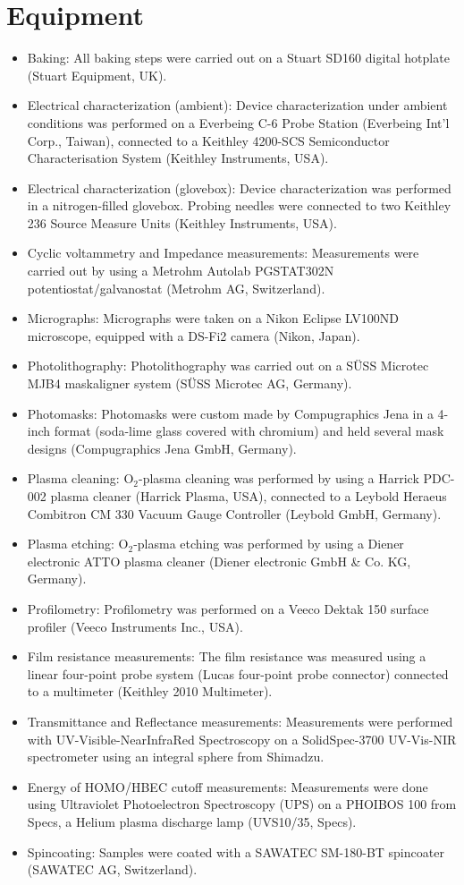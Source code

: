 \section{Equipment}
\begin{itemize}
\item Baking: All baking steps were carried out on a Stuart SD160 digital hotplate (Stuart Equipment, UK). 
\item Electrical characterization (ambient): Device characterization under ambient conditions was performed on a Everbeing C-6 Probe Station (Everbeing Int’l Corp., Taiwan), connected to a Keithley 4200-SCS Semiconductor Characterisation System (Keithley Instruments, USA). 
\item Electrical characterization (glovebox): Device characterization was performed in a nitrogen-filled glovebox. Probing needles were connected to two Keithley 236 Source Measure Units (Keithley Instruments, USA). 
\item Cyclic voltammetry and Impedance measurements: Measurements were carried out by using a Metrohm Autolab PGSTAT302N potentiostat/galvanostat (Metrohm AG, Switzerland).
\item Micrographs: Micrographs were taken on a Nikon Eclipse LV100ND microscope, equipped with a DS-Fi2 camera (Nikon, Japan). 
\item Photolithography: Photolithography was carried out on a SÜSS Microtec MJB4 maskaligner system (SÜSS Microtec AG, Germany). 
\item Photomasks: Photomasks were custom made by Compugraphics Jena in a 4-inch format (soda-lime glass covered with chromium) and held several mask designs (Compugraphics Jena GmbH, Germany). 
\item Plasma cleaning: O$_{2}$-plasma cleaning was performed by using a Harrick PDC-002 plasma cleaner (Harrick Plasma, USA), connected to a Leybold Heraeus Combitron CM 330 Vacuum Gauge Controller (Leybold GmbH, Germany). 
\item Plasma etching: O$_{2}$-plasma etching was performed by using a Diener electronic ATTO plasma cleaner (Diener electronic GmbH \& Co. KG, Germany). 
\item Profilometry: Profilometry was performed on a Veeco Dektak 150 surface profiler (Veeco Instruments Inc., USA).
\item Film resistance measurements: The film resistance was measured using a linear four-point probe system (Lucas four-point probe connector) connected to a multimeter (Keithley 2010 Multimeter).
\item Transmittance and Reflectance measurements: Measurements were performed with UV-Visible-NearInfraRed Spectroscopy on a SolidSpec-3700 UV-Vis-NIR spectrometer using an integral sphere from Shimadzu.
\item Energy of HOMO/HBEC cutoff measurements: Measurements were done using Ultraviolet Photoelectron Spectroscopy (UPS) on a PHOIBOS 100 from Specs, a Helium plasma discharge lamp (UVS10/35, Specs).
\item Spincoating: Samples were coated with a SAWATEC SM-180-BT spincoater (SAWATEC AG, Switzerland).
\end{itemize}

